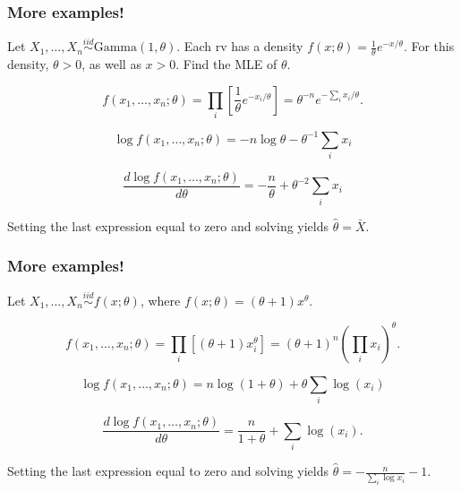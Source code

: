 \documentclass{beamer}
\begin{document}
% 
% 
\begin{frame}
\frametitle{More examples!}

Let $X_1, \ldots, X_n \overset{iid}{\sim} \text{Gamma}(1,\theta)$. Each rv has a density $f(x;\theta) = \frac{1}{\theta} e^{-x/\theta}$. For this density, $\theta >0$, as well as $x>0$. Find the MLE of $\theta$.
\pause

\[
f(x_1,\ldots,x_n;\theta) = \prod_i \left[\frac{1}{\theta} e^{-x_i/\theta}\right] = \theta^{-n} e^{-\sum_i x_i / \theta}.
\]
\pause

\[
\log f(x_1,\ldots,x_n;\theta) = -n\log \theta - \theta^{-1} \sum_i x_i 
\]
\pause

\[
\frac{ d  \log f(x_1,\ldots,x_n;\theta)}{d \theta} = - \frac{n}{\theta} + \theta^{-2} \sum_i x_i
\]
\pause

Setting the last expression equal to zero and solving yields $\hat{\theta} = \bar{X}$.
\end{frame}

\begin{frame}
\frametitle{More examples!}

Let $X_1, \ldots, X_n \overset{iid}{\sim} f(x;\theta)$, where $f(x;\theta) = (\theta+1)x^{\theta}$.
\pause

\[
f(x_1,\ldots,x_n;\theta) = \prod_i \left[(\theta+1)x_i^{\theta} \right] = (\theta+1)^n (\prod_i x_i)^{\theta}.
\]
\pause

\[
\log f(x_1,\ldots,x_n;\theta) = n\log(1+ \theta) + \theta \sum_i \log (x_i) 
\]
\pause

\[
\frac{ d  \log f(x_1,\ldots,x_n;\theta)}{d \theta} = \frac{n}{1+\theta} + \sum_i \log (x_i) .
\]
\pause

Setting the last expression equal to zero and solving yields $\hat{\theta} = - \frac{n}{\sum_i \log x_i} - 1$.
\end{frame}
\end{document}
